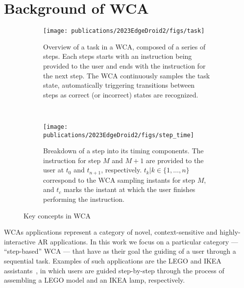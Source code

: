 \section{Background of \gls{WCA}}\label{sec:background}

\begin{figure}
    \centering
    \begin{subfigure}{\columnwidth}
        \centering
        \texttt{[image: publications/2023EdgeDroid2/figs/task]}
        \caption{%
            Overview of a task in a \gls{WCA}, composed of a series of steps.
            Each steps starts with an instruction being provided to the user and ends with the instruction for the next step.
            The \gls{WCA} continuously samples the task state, automatically triggering transitions between steps as correct (or incorrect) states are recognized.
        }\label{fig:task}
    \end{subfigure}\\
    \begin{subfigure}{\columnwidth}
        \centering
        \texttt{[image: publications/2023EdgeDroid2/figs/step\_time]}
        \caption{%
            Breakdown of a step into its timing components.
            The instruction for step \( M \) and \( M + 1 \) are provided to the user at \( t_0 \) and \( t_{n+1} \), respectively.
            \( t_k | k \in \{1, \ldots, n \} \) correspond to the \gls{WCA} sampling instants for step \( M \), and \( t_c \) marks the instant at which the user finishes performing the instruction.
        }\label{fig:step}
    \end{subfigure}
    \caption{Key concepts in \gls{WCA}}
\end{figure}

\glspl{WCA} applications represent a category of novel, context-sensitive and highly-interactive \gls{AR} applications.
In this work we focus on a particular category --- ``step-based'' \gls{WCA} --- that have as their goal the guiding of a user through a sequential task.
Examples of such applications are the LEGO and IKEA assistants~\cite{Chen2015LEGO,Chen2018application}, in which users are guided step-by-step through the process of assembling a LEGO model and an IKEA lamp, respectively.

